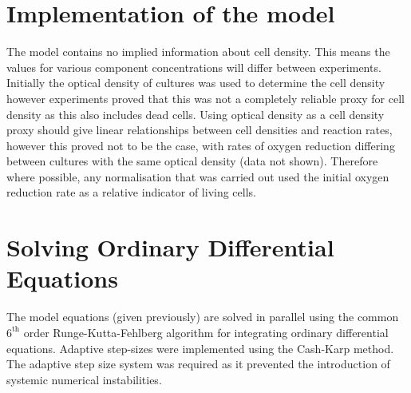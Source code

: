 \section{Implementation of the model}

The model contains no implied information about cell density. This means the values for various component concentrations will differ between experiments. 
Initially the optical density of cultures was used to determine the cell density however experiments proved that this was not a completely reliable proxy for cell density as this also includes dead cells. Using optical density as a cell density proxy should give linear relationships between cell densities and reaction rates, however this proved not to be the case, with rates of oxygen reduction differing between cultures with the same optical density (data not shown). Therefore where possible, any normalisation that was carried out used the initial oxygen reduction rate as a relative indicator of living cells.


\section{Solving Ordinary Differential Equations}
The model equations (given previously) are solved in parallel using the common $\mathrm{6}^\mathrm{th}$ order Runge-Kutta-Fehlberg algorithm for integrating ordinary differential equations\cite{Butcher2003}. Adaptive step-sizes were implemented using the Cash-Karp method\cite{Cash1990}. The adaptive step size system was required as it prevented the introduction of systemic numerical instabilities.

